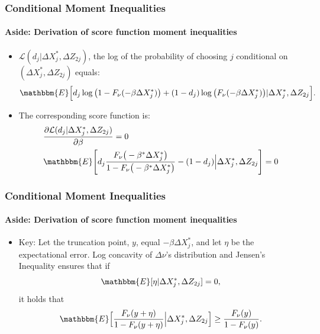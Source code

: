 \documentclass[10pt,letterpaper]{beamer}
\begin{document}
\begin{frame}
\frametitle{Conditional Moment Inequalities} \framesubtitle{Aside:
Derivation of score function moment inequalities}

\begin{itemize}
\item $\mathcal{L}(d_{j}|\Delta X^{*}_{j},\Delta Z_{2j})$, the log of the
probability of choosing $j$ conditional on $(\Delta X_{j}^{*},\Delta Z_{2j})$
equals:  
\begin{equation*}
\mathbbm{E}\Big[d_{j}\log\big(1-F_{\nu}(-\beta\Delta X^{*}_{j})\big)%
+(1-d_{j})\log\big(F_{\nu}(-\beta\Delta X^{*}_{j})\big)|\Delta
X_{j}^{*},\Delta Z_{2j}\Big].
\end{equation*}

\item The corresponding score function is:  
\begin{eqnarray*}
&\frac{\partial\mathcal{L}(d_{j}|\Delta X_{j}^{*},\Delta Z_{2j})}{%
\partial\beta}=0 \\
&\mathbbm{E}\Bigg[d_{j}\frac{F_{\nu}\big(-\beta^{*} \Delta X^{*}_{j}\big)}{%
1-F_{\nu}\big(-\beta^{*} \Delta X^{*}_{j}\big)}-(1-d_{j})\Big|\Delta
X_{j}^{*},\Delta Z_{2j}\Bigg]=0
\end{eqnarray*}
\end{itemize}
\end{frame}


\begin{frame}
\frametitle{Conditional Moment Inequalities} \framesubtitle{Aside:
Derivation of score function moment inequalities}

\begin{itemize}
\item Key: Let the truncation point, $y$, equal $-\beta \Delta X_{j}^{*}$,
and let $\eta$ be the expectational error. Log concavity of $\Delta \nu$'s
distribution and Jensen's Inequality ensures that if  
\begin{equation*}
\mathbbm{E}[\eta|\Delta X_{j}^{*},\Delta Z_{2j}]=0,
\end{equation*}
it holds that  
\begin{equation*}
\mathbbm{E}\Big[\frac{F_{\nu}(y+\eta)}{1-F_{\nu}(y+\eta)}\Big|\Delta
X_{j}^{*},\Delta Z_{2j}\Big]\geq\frac{F_{\nu}(y)}{1-F_{\nu}(y)}.
\end{equation*}
\end{itemize}
\end{frame}
\end{document}
